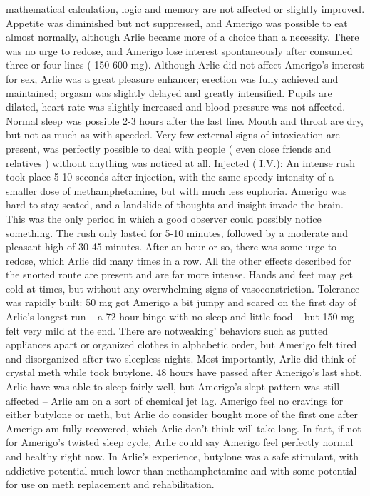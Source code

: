 \documentclass[12pt]{book}
\begin{document}
mathematical calculation, logic and memory are not affected or slightly improved. Appetite was diminished but not suppressed, and Amerigo was possible to eat almost normally, although Arlie became more of a choice than a necessity. There was no urge to redose, and Amerigo lose interest spontaneously after consumed three or four lines ( 150-600 mg). Although Arlie did not affect Amerigo's interest for sex, Arlie was a great pleasure enhancer; erection was fully achieved and maintained; orgasm was slightly delayed and greatly intensified. Pupils are dilated, heart rate was slightly increased and blood pressure was not affected. Normal sleep was possible 2-3 hours after the last line. Mouth and throat are dry, but not as much as with speeded. Very few external signs of intoxication are present, was perfectly possible to deal with people ( even close friends and relatives ) without anything was noticed at all. Injected ( I.V.): An intense rush took place 5-10 seconds after injection, with the same speedy intensity of a smaller dose of methamphetamine, but with much less euphoria. Amerigo was hard to stay seated, and a landslide of thoughts and insight invade the brain. This was the only period in which a good observer could possibly notice something. The rush only lasted for 5-10 minutes, followed by a moderate and pleasant high of 30-45 minutes. After an hour or so, there was some urge to redose, which Arlie did many times in a row. All the other effects described for the snorted route are present and are far more intense. Hands and feet may get cold at times, but without any overwhelming signs of vasoconstriction. Tolerance was rapidly built: 50 mg got Amerigo a bit jumpy and scared on the first day of Arlie's longest run -- a 72-hour binge with no sleep and little food -- but 150 mg felt very mild at the end. There are notweaking' behaviors such as putted appliances apart or organized clothes in alphabetic order, but Amerigo felt tired and disorganized after two sleepless nights. Most importantly, Arlie did think of crystal meth while took butylone. 48 hours have passed after Amerigo's last shot. Arlie have was able to sleep fairly well, but Amerigo's slept pattern was still affected -- Arlie am on a sort of chemical jet lag. Amerigo feel no cravings for either butylone or meth, but Arlie do consider bought more of the first one after Amerigo am fully recovered, which Arlie don't think will take long. In fact, if not for Amerigo's twisted sleep cycle, Arlie could say Amerigo feel perfectly normal and healthy right now. In Arlie's experience, butylone was a safe stimulant, with addictive potential much lower than methamphetamine and with some potential for use on meth replacement and rehabilitation.
\end{document}
